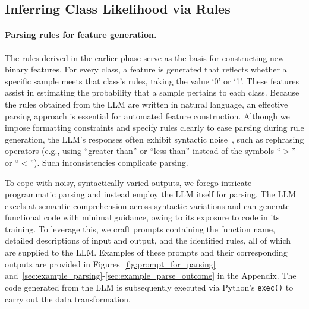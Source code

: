\subsection{Inferring Class Likelihood via Rules}
\label{Sec:training}

\paragraph{Parsing rules for feature generation.} The rules derived in the earlier phase serve as the basis for constructing new binary features. For every class, a feature is generated that reflects whether a specific sample meets that class's rules, taking the value ‘0’ or ‘1’. These features assist in estimating the probability that a sample pertains to each class. Because the rules obtained from the LLM are written in natural language, an effective parsing approach is essential for automated feature construction. Although we impose formatting constraints and specify rules clearly to ease parsing during rule generation, the LLM’s responses often exhibit syntactic noise~\cite{kovavc2023large}, such as rephrasing operators (e.g., using “greater than” or “less than” instead of the symbols “$>$” or “$<$”). Such inconsistencies complicate parsing.

To cope with noisy, syntactically varied outputs, we forego intricate programmatic parsing and instead employ the LLM itself for parsing. The LLM excels at semantic comprehension across syntactic variations and can generate functional code with minimal guidance, owing to its exposure to code in its training. To leverage this, we craft prompts containing the function name, detailed descriptions of input and output, and the identified rules, all of which are supplied to the LLM. Examples of these prompts and their corresponding outputs are provided in Figures~\ref{fig:prompt_for_parsing} and~\ref{sec:example_parsing}-\ref{sec:example_parse_outcome} in the Appendix. The code generated from the LLM is subsequently executed via Python’s \texttt{exec()} to carry out the data transformation.

\vspace*{-0.12in}
